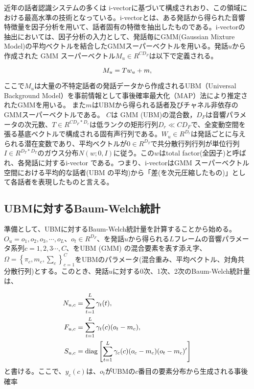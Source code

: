 近年の話者認識システムの多くは i-vector\cite{iv}に基づいて構成されおり、この領域における最高水準の技術となっている。i-vectorとは、ある発話から得られた音響特徴量を因子分析を用いて、話者固有の特徴を抽出したものである。i-vectorの抽出においては、因子分析の入力として、発話毎にGMM(Gaussian Mixture Model)の平均ベクトルを結合したGMMスーパーベクトルを用いる。発話$u$から作成された GMM スーパーベクトル$M_u∈R^{CD_F}$は以下で定義される。

\begin{equation}
M_u=T w_u + m, \notag
\end{equation}

ここで$M_u$は大量の不特定話者の発話データから作成されるUBM（Universal Background Model）を事前情報として事後確率最大化（MAP）法により推定されたGMMを用いる。
また$m$はUBMから得られる話者及びチャネル非依存のGMMスーパーベクトルである。
$C$は GMM (UBM)の混合数，$D_F$は音響パラメータの次元数、$T∈R^{CD_F*D_r}$は低ランクの矩形行列$D_r \ll CD_F$で、全変動空間を張る基底ベクトルで構成される固有声行列である。$W_u \in R^{D_r}$は発話ごとに与えられる潜在変数であり、平均ベクトルが$0 \in R^{D_T}$で共分散行列行列が単位行列$I \in R^{D_T*D_T}$のガウス分布$N(w ; 0,I)$に従う。この$w$はtotal factor(全因子)と呼ばれ、各発話に対するi-vector である。つまり、i-vectorはGMM スーパーベクトル空間における平均的な話者(UBM の平均)から「差(を次元圧縮したもの)」として各話者を表現したものと言える。

\subsection{UBMに対するBaum-Welch統計}
準備として、UBMに対するBaum-Welch統計量を計算することから始める。
$O_u={o_1,o_2,o_3,\cdots,o_L}$、$o_t\in R^{D_F}$、を発話$u$から得られる$L$フレームの音響パラメータ系列$c=1,2,3\cdots,C$、をUBM (GMM) の混合要素を表す添え字、$\Omega=\left\{\pi_c,m_c,\sum_{c}\right\}_{c=1}^{C}$をUBMのパラメータ(混合重み、平均ベクトル、対角共分散行列)とする。このとき、発話$u$に対する0次、1次、2次のBaum-Welch統計量は、

\begin{align}
N_{u,c} &=\sum_{t=1}^{L}\gamma_t(t), \notag \\
F_{u,c} &=\sum_{t=1}^{L}\gamma_t(c)(o_t-m_c), \notag \\
S_{u,c} &=\diag\left[\sum_{t=1}^L\gamma_c(c)(o_c-m_c)(o_t-m_c)^\prime\right] \notag 
\end{align}
と書ける。ここで、$y_c(c)$は、$o_t$がUBMの$c$番目の要素分布から生成される事後確率

